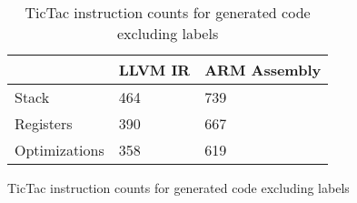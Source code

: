 \begin{table}[h!]
\centering
\begin{tabular}{p{}p{}p{}}
  \hline
 & LLVM IR & ARM Assembly \\ 
  \hline
Stack & 464 & 739 \\ 
  Registers & 390 & 667 \\ 
  Optimizations & 358 & 619 \\ 
   \hline
\end{tabular}
\caption{TicTac instruction counts for generated code excluding labels}
\caption{TicTac instruction counts for generated code excluding labels}
\end{table}
